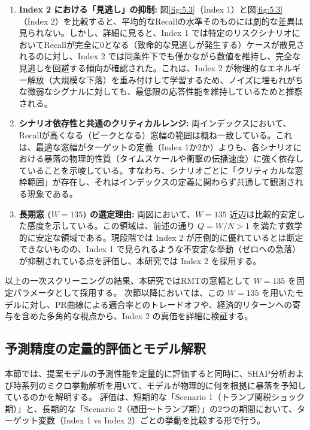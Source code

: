 \documentclass[11pt,a4paper,oneside]{ltjsarticle}
\begin{document}
\begin{enumerate}
    \item \textbf{Index 2 における「見逃し」の抑制:}
    図\ref{fig:5.3}（Index 1）と図\ref{fig:5.3}（Index 2）を比較すると、平均的なRecallの水準そのものには劇的な差異は見られない。しかし、詳細に見ると、Index 1 では特定のリスクシナリオにおいてRecallが完全に0となる（致命的な見逃しが発生する）ケースが散見されるのに対し、Index 2 では同条件下でも僅かながら数値を維持し、完全な見逃しを回避する傾向が確認された。これは、Index 2 が物理的なエネルギー解放（大規模な下落）を重み付けして学習するため、ノイズに埋もれがちな微弱なシグナルに対しても、最低限の応答性能を維持しているためと推察される。

    \item \textbf{シナリオ依存性と共通のクリティカルレンジ:}
    両インデックスにおいて、Recallが高くなる（ピークとなる）窓幅の範囲は概ね一致している。これは、最適な窓幅がターゲットの定義（Index 1か2か）よりも、各シナリオにおける暴落の物理的性質（タイムスケールや衝撃の伝播速度）に強く依存していることを示唆している。すなわち、シナリオごとに「クリティカルな窓枠範囲」が存在し、それはインデックスの定義に関わらず共通して観測される現象である。

    \item \textbf{長期窓 ($W=135$) の選定理由:}
    両図において、$W=135$ 近辺は比較的安定した感度を示している。この領域は、前述の通り $Q = W/N > 1$ を満たす数学的に安定な領域である。現段階では Index 2 が圧倒的に優れているとは断定できないものの、Index 1 で見られるような不安定な挙動（ゼロへの急落）が抑制されている点を評価し、本研究では Index 2 を採用する。
\end{enumerate}

以上の一次スクリーニングの結果、本研究ではRMTの窓幅として \textbf{$W=135$} を固定パラメータとして採用する。
次節以降においては、この $W=135$ を用いたモデルに対し、PR曲線による適合率とのトレードオフや、経済的リターンへの寄与を含めた多角的な視点から、Index 2 の真価を詳細に検証する。

\subsection{予測精度の定量的評価とモデル解釈}
本節では、提案モデルの予測性能を定量的に評価すると同時に、SHAP分析および時系列のミクロ挙動解析を用いて、モデルが物理的に何を根拠に暴落を予知しているのかを解明する。
評価は、短期的な「Scenario 1（トランプ関税ショック期）」と、長期的な「Scenario 2（植田～トランプ期）」の2つの期間において、ターゲット変数（Index 1 vs Index 2）ごとの挙動を比較する形で行う。
\end{document}
